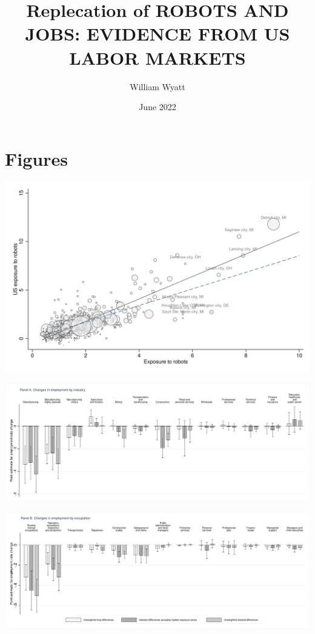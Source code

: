 \documentclass{article}
\title{Replecation of ROBOTS AND JOBS: EVIDENCE FROM US LABOR MARKETS}
\author{William Wyatt }
\date{June 2022}
\begin{document}
\maketitle
\newpage
\section{Figures}
\begin{center}\includegraphics[scale=0.15]{output/figure_first_stage.png}\end{center}
\begin{center}\includegraphics[scale=0.15]{output/figure_heterogeneity_appendix_industry.png}\end{center}
\begin{center}\includegraphics[scale=0.15]{output/figure_heterogeneity_appendix_occupation.png}\end{center}
\end{document}
